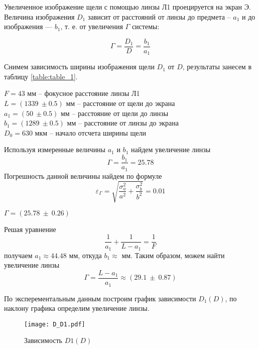 	Увеличенное изображение щели с помощью линзы Л1 проецируется на экран Э. Величина изображения $D_1$ зависит от расстояний от линзы до предмета -- $a_1$ и до изображения — $b_1$, т. е. от увеличения $\Gamma$ системы:
	
	\begin{equation}
		\Gamma=\frac{D_{1}}{D}=\frac{b_{1}}{a_{1}}
	\end{equation}
	
	Снимем зависимость ширины изображения щели $D_1$ от $D$, результаты занесем в таблицу \ref{table:table_1}.
	
	
	
	\begin{center}
		$F = 43$ мм -- фокусное расстояние линзы Л1 \\
		$L = (1339 ~ \pm 0.5)$ мм -- расстояние от щели до экрана \\
		$a_1 = (50 ~ \pm 0.5)$ мм -- расстояние от щели до линзы \\
		$b_1 = (1289 ~ \pm 0.5)$ мм -- расстояние от линзы до экрана \\
		$D_0 = 630$ мкм -- начало отсчета ширины щели \\
	\end{center}

	Используя измеренные величины $a_1$ и $b_1$ найдем увеличение линзы
	\[ \Gamma = \frac{b_1}{a_1} = 25.78 \]
	Погрешность данной величины найдем по формуле
	\[ \varepsilon_{\Gamma} = \sqrt{\frac{\sigma_a^2}{a^2} + \frac{\sigma_b^2}{b^2}} = 0.01 \]
	
	\begin{center}
		$\Gamma = (25.78 ~ \pm ~ 0.26)$
	\end{center}

	Решая уравнение
	\[ \frac{1}{a_1} + \frac{1}{L - a_1} = \frac{1}{F} \]
	получаем $a_1 \approx 44.48$ мм, откуда $b_1 \approx$ мм. Таким образом, можем найти увеличение линзы
	\[ \Gamma = \frac{L - a_1}{a_1} \approx (29.1 ~ \pm ~ 0.87) \]
    
    По эксперементальным данным построим график зависимости $D_1(D)$, по наклону графика определим увеличение линзы.
    
    \begin{figure}[h!]
    	\centering
    	\texttt{[image: D\_D1.pdf]}
    	\caption{Зависимость $D1(D)$}
    \end{figure}

